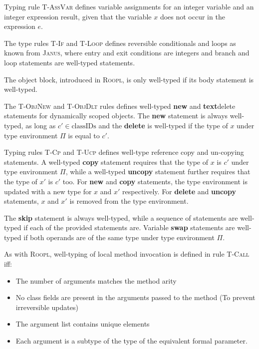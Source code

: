 Typing rule \textsc{T-AssVar} defines variable assignments for an integer variable and an integer expression result, given that the variable $x$ does not occur in the expression $e$. 

The type rules \textsc{T-If} and \textsc{T-Loop} defines reversible conditionals and loops as known from \textsc{Janus}, where entry and exit conditions are integers and branch and loop statements are well-typed statements. 

The object block, introduced in \textsc{Roopl}, is only well-typed if its body statement is well-typed. 

The \textsc{T-ObjNew} and \textsc{T-ObjDlt} rules defines well-typed \textbf{new} and \textbf{text}{delete} statements for dynamically scoped objects. The \textbf{new} statement is always well-typed, as long as $c' \in \text{classIDs}$ and the \textbf{delete} is well-typed if the type of $x$ under type environment $\Pi$ is equal to $c'$. 

Typing rules \textsc{T-Cp} and \textsc{T-Ucp} defines well-type reference copy and un-copying statements. A well-typed \textbf{copy} statement requires that the type of $x$ is $c'$ under type environment $\Pi$, while a well-typed \textbf{uncopy} statement further requires that the type of $x'$ is $c'$ too. For \textbf{new} and \textbf{copy} statements, the type environment is updated with a new type for $x$ and $x'$ respectively. For \textbf{delete} and \textbf{uncopy} statements, $x$ and $x'$ is removed from the type environment.

The \textbf{skip} statement is always well-typed, while a sequence of statements are well-typed if each of the provided statements are. Variable \textbf{swap} statements are well-typed if both operands are of the same type under type environment $\Pi$.

As with \textsc{Roopl}, well-typing of local method invocation is defined in rule \textsc{T-Call} iff:
\begin{itemize}
    \item The number of arguments matches the method arity
    \item No class fields are present in the arguments passed to the method (To prevent irreversible updates)
    \item The argument list contains unique elements
    \item Each argument is a subtype of the type of the equivalent formal parameter. 
\end{itemize}

